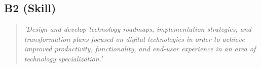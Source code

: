 \subsection*{B2 (Skill)}

  \begin{quote}
    \textit{'Design and develop technology roadmaps,
    implementation strategies, and transformation plans
    focused on digital technologies in order to achieve
    improved productivity, functionality, and end-user
    experience in an area of technology specialization.'}
  \end{quote}

\newpage